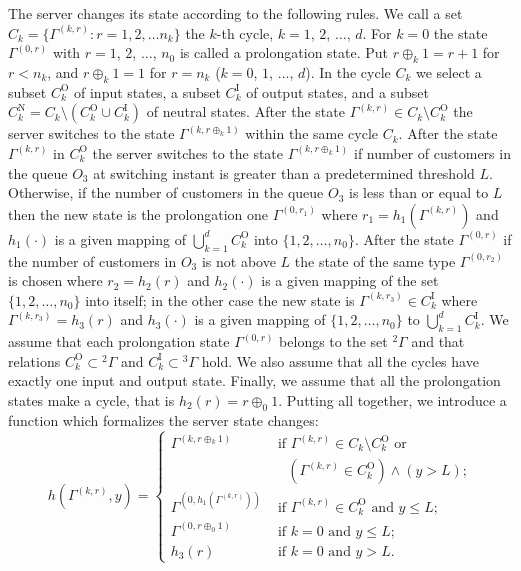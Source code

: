 \documentclass[runningheads,a4paper]{llncs}
\begin{document}
The server changes its state according to the following rules. We call a set $C_k = \{\Gamma^{(k,r)}
\colon r=1,2,\ldots n_k\}$ the $k$-th cycle, $k=1$, $2$, $\ldots$, $d$. For $k=0$ the state
$\Gamma^{(0,r)}$ with $r=1$, $2$, $\ldots$, $n_0$ is called a prolongation state. Put $r \oplus_k 1
= r+1$ for $r<n_k$, and $r \oplus_k 1 = 1$ for $r=n_k$ ($k = 0$, $1$, $\ldots$, $d$). In the cycle
$C_k$ we select a subset $C_k^{\mathrm{O}}$ of input states, a subset $C_k^{\mathrm{I}}$ of output
states, and a subset $C_k^{\mathrm{N}} = C_k \setminus (C_k^{\mathrm{O}} \cup C_k^{\mathrm{I}})$ of
neutral states.  After the state $\Gamma^{(k,r)} \in C_k\setminus C_k^{\mathrm{O}}$ the server
switches to the state $\Gamma^{(k,r \oplus_k 1)}$ within the same cycle $C_k$.  After the state
$\Gamma^{(k,r)}$ in $C_k^{\mathrm{O}}$ the server switches to the state $\Gamma^{(k,r \oplus_k 1)}$
if number of customers in the queue $O_3$ at switching instant is greater than a predetermined
threshold $L$.  Otherwise, if the number of customers in the queue $O_3$ is less than or equal to $L$
then the new state is the prolongation one $\Gamma^{(0,r_1)}$ where $r_1=h_1(\Gamma^{(k,r)})$ and
$h_1(\cdot)$ is a given mapping of $\bigcup_{k=1}^d C_k^{\mathrm{O}}$ into $\{1,2,\ldots,
n_0\}$.  After the state $\Gamma^{(0,r)}$ if the number of customers in $O_3$ is not above $L$ the
state of the same type $\Gamma^{(0,r_2)}$ is chosen where $r_2=h_2(r)$ and $h_2(\cdot)$ is a given
mapping of the set $\{1,2, \ldots, n_0\}$ into itself; in the other case the new state is
$\Gamma^{(k,r_3)} \in C_k^{\mathrm{I}}$ where $\Gamma^{(k,r_3)}=h_3(r)$ and $h_3(\cdot)$ is a 
given mapping of  $\{1,2, \ldots, n_0\}$ to $\bigcup_{k=1}^d C_k^{\mathrm{I}}$. We assume
that each prolongation state $\Gamma^{(0,r)}$ belongs to the set ${}^2 \Gamma$ and that relations
$C_k^\mathrm{O}\subset {}^2 \Gamma$ and $C_k^\mathrm{I}\subset {}^3 \Gamma$ hold. We also assume
that all the cycles have exactly one input and output state. Finally, we assume that all the
prolongation states make a cycle, that is  $h_2(r)=r\oplus_0 1$. Putting all together, we introduce
a function which formalizes the server state changes:
\begin{equation}
h(\Gamma^{(k,r)},y) = 
\begin{cases}
\Gamma^{(k,r \oplus_k 1)}&  \text{ if  $\Gamma^{(k,r)}\in C_k\setminus C_k^{\mathrm{O}}$ or} \\ & \quad \text{$(\Gamma^{(k,r)}\in C_k^{\mathrm{O}}) \wedge (y>L)$;}\\
\Gamma^{(0,h_1(\Gamma^{(k,r)}))}&  \text{ if  $\Gamma^{(k,r)}\in C_k^{\mathrm{O}}$ and $y\leqslant L$;}\\
\Gamma^{(0,r \oplus_0 1)}&  \text{ if $k=0$ and $y\leqslant L$;}\\
h_3(r)&  \text{ if  $k=0$ and $y > L$.}
\end{cases}
\label{hLaw}
\end{equation}
\end{document}
